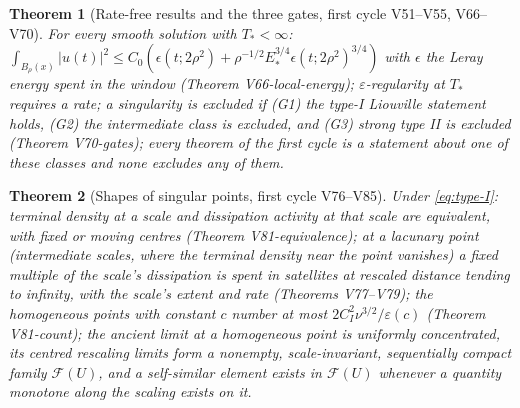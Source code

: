 \documentclass[11pt]{article}
\theoremstyle{plain}
\newtheorem{theorem}{Theorem}[section]
\theoremstyle{definition}
\theoremstyle{remark}
\begin{document}
\begin{theorem}[Rate-free results and the three gates, first cycle V51--V55, V66--V70]
\label{thm:c4v1-rate-free}
For every smooth solution with \(T_*<\infty\):
\(\int_{B_\rho(x)}|u(t)|^2\le C_0(\epsilon(t;2\rho^2)+\rho^{-1/2}E_*^{3/4}\epsilon(t;2\rho^2)^{3/4})\)
with \(\epsilon\) the Leray energy spent in the window (Theorem
V66-local-energy); \(\varepsilon\)-regularity at \(T_*\) requires a rate; a
singularity is excluded if (G1) the type-I Liouville statement holds,
(G2) the intermediate class is excluded, and (G3) strong type II is
excluded (Theorem V70-gates); every theorem of the first cycle is a
statement about one of these classes and none excludes any of them.
\end{theorem}

\begin{theorem}[Shapes of singular points, first cycle V76--V85]
\label{thm:c4v1-shapes}
Under \eqref{eq:type-I}: terminal density at a scale and dissipation
activity at that scale are equivalent, with fixed or moving centres
(Theorem V81-equivalence); at a lacunary point (intermediate scales,
where the terminal density near the point vanishes) a fixed multiple
of the scale's dissipation is spent in satellites at rescaled distance
tending to infinity, with the scale's extent and rate (Theorems
V77--V79); the homogeneous points with constant \(c\) number at most
\(2C_I^2\nu^{3/2}/\varepsilon(c)\) (Theorem V81-count); the ancient limit at a
homogeneous point is uniformly concentrated, its centred rescaling
limits form a nonempty, scale-invariant, sequentially compact family
\(\mathcal F(U)\), and a self-similar element exists in \(\mathcal F(U)\)
whenever a quantity monotone along the scaling exists on it.
\end{theorem}
\end{document}
